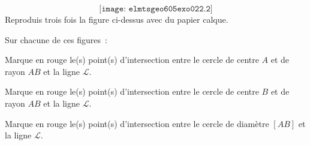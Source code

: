 \[\texttt{[image: elmtsgeo605exo022.2]}\]
Reproduis trois fois la figure ci-dessus avec du papier calque.
\par Sur chacune de ces figures :
\begin{myenumerate}
\item Marque en rouge le(s) point(s) d'intersection entre le cercle de
  centre $A$ et de rayon $AB$ et la ligne $\mathscr{L}$.
\item Marque en rouge le(s) point(s) d'intersection entre le cercle de
  centre $B$ et de rayon $AB$ et la ligne $\mathscr{L}$.
\item Marque en rouge le(s) point(s) d'intersection entre le cercle de
  diamètre $[AB]$ et la ligne $\mathscr{L}$.
\end{myenumerate}
